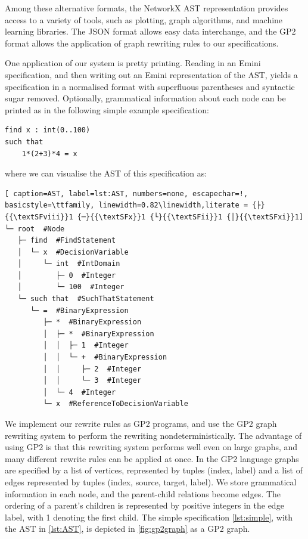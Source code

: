\documentclass[a4paper,UKenglish,cleveref, autoref,pdfa]{lipics-v2021}
\begin{document}
Among these alternative formats, the NetworkX AST representation provides access to a variety of tools, such as plotting, graph algorithms, and machine learning libraries. The JSON format allows easy data interchange, and the GP2 format allows the application of graph rewriting rules to our specifications.

One application of our system is pretty printing.
Reading in an Emini specification, and then writing out an Emini representation of the AST, yields a specification in a normalised format with superfluous parentheses and syntactic sugar removed. Optionally, grammatical information about each node can be printed as in the following simple example specification:
\begin{lstlisting}[caption=Example specification, label=lst:simple]
find x : int(0..100)
such that
    1*(2+3)*4 = x
\end{lstlisting}
where we can visualise the AST of this specification as:
\begin{lstlisting}[ caption=AST, label=lst:AST, numbers=none, escapechar=!, basicstyle=\ttfamily, linewidth=0.82\linewidth,literate = {├}{{\textSFviii}}1 {─}{{\textSFx}}1 {└}{{\textSFii}}1 {│}{{\textSFxi}}1] 
└─ root  #Node
   ├─ find  #FindStatement
   │  └─ x  #DecisionVariable
   │     └─ int  #IntDomain
   │        ├─ 0  #Integer
   │        └─ 100  #Integer
   └─ such that  #SuchThatStatement
      └─ =  #BinaryExpression
         ├─ *  #BinaryExpression
         │  ├─ *  #BinaryExpression
         │  │  ├─ 1  #Integer
         │  │  └─ +  #BinaryExpression
         │  │     ├─ 2  #Integer
         │  │     └─ 3  #Integer
         │  └─ 4  #Integer
         └─ x  #ReferenceToDecisionVariable
\end{lstlisting}

We implement our rewrite rules as GP2 programs, and use the GP2 graph rewriting system to perform the rewriting nondeterministically.
The advantage of using GP2 is that this rewriting system performs well even on large graphs, and many different rewrite rules can be applied at once.
In the GP2 language graphs are specified by a list of vertices, represented by tuples (index, label) and a list of edges represented by tuples (index, source, target, label).
We store grammatical information in each node, and the parent-child relations become edges.
The ordering of a parent's children is represented by positive integers in the edge label, with 1 denoting the first child. The simple specification \cref{lst:simple}, with the AST in \cref{lst:AST}, is depicted in \cref{fig:gp2graph} as a GP2 graph.
\end{document}

